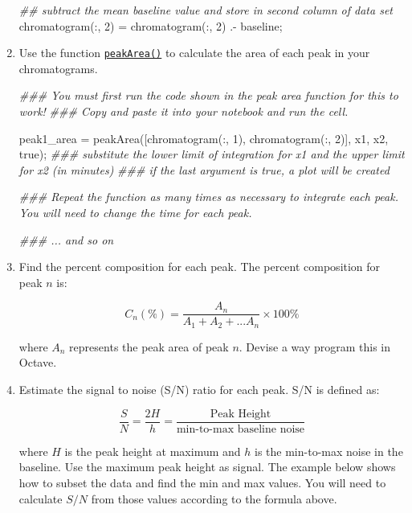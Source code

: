 \documentclass[]{tufte-book}
\newenvironment{Shaded}{}{}
\newcommand{\CommentTok}[1]{\textcolor[rgb]{0.38,0.63,0.69}{\textit{#1}}}
\newcommand{\FloatTok}[1]{\textcolor[rgb]{0.25,0.63,0.44}{#1}}
\newcommand{\FunctionTok}[1]{\textcolor[rgb]{0.02,0.16,0.49}{#1}}
\newcommand{\NormalTok}[1]{#1}
\newcommand{\OperatorTok}[1]{\textcolor[rgb]{0.40,0.40,0.40}{#1}}
\begin{document}
\begin{enumerate}
\begin{Shaded}
\begin{Highlighting}[]
\CommentTok{## subtract the mean baseline value and store in second column of data set}
\NormalTok{chromatogram(}\OperatorTok{:,} \FloatTok{2}\NormalTok{) }\OperatorTok{=}\NormalTok{ chromatogram(}\OperatorTok{:,} \FloatTok{2}\NormalTok{) .}\OperatorTok{-}\NormalTok{ baseline}\OperatorTok{;}  
\end{Highlighting}
\end{Shaded}
\item
  Use the function \protect\hyperlink{find-peak-area}{\texttt{peakArea()}} to calculate the area of each peak in your chromatograms.

\begin{Shaded}
\begin{Highlighting}[]
\CommentTok{### You must first run the code shown in the peak area function for this to work!}
\CommentTok{### Copy and paste it into your notebook and run the cell.}

\NormalTok{peak1_area }\OperatorTok{=}\NormalTok{ peakArea([chromatogram(}\OperatorTok{:,} \FloatTok{1}\NormalTok{)}\OperatorTok{,}\NormalTok{ chromatogram(}\OperatorTok{:,} \FloatTok{2}\NormalTok{)]}\OperatorTok{,}\NormalTok{ x1}\OperatorTok{,}\NormalTok{ x2}\OperatorTok{,} \FunctionTok{true}\NormalTok{)}\OperatorTok{;}
\CommentTok{### substitute the lower limit of integration for x1 and the upper limit for x2 (in minutes)}
\CommentTok{### if the last argument is true, a plot will be created}

\CommentTok{### Repeat the function as many times as necessary to integrate each peak.  You will need to change the time for each peak.}

\CommentTok{### ... and so on}
\end{Highlighting}
\end{Shaded}
\item
  Find the percent composition for each peak. The percent composition for peak \(n\) is:

  \[
   C_n(\%)=\frac{A_n}{A_1 + A_2 + ... A_n} \times 100\%
   \]

  where \(A_n\) represents the peak area of peak \(n\). Devise a way program this in Octave.
\item
  Estimate the signal to noise (S/N) ratio for each peak. S/N is defined as:

  \[
   \frac{S}{N} = \frac{2H}{h} = \frac{\text{Peak Height}}{\text{min-to-max baseline noise}}
   \]

  where \(H\) is the peak height at maximum and \(h\) is the min-to-max noise in the baseline. Use the maximum peak height as signal. The example below shows how to subset the data and find the min and max values. You will need to calculate \(S/N\) from those values according to the formula above.


\end{enumerate}
\end{document}
